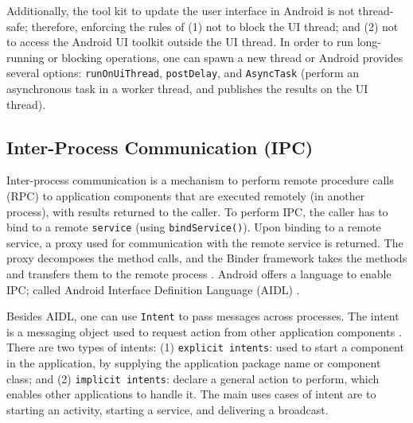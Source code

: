Additionally, the tool kit to update the user interface in Android is not thread-safe; therefore, enforcing the rules of (1) not to block the UI thread; and (2) not to access the Android UI toolkit outside the UI thread. In order to run long-running or blocking operations, one can spawn a new thread or Android provides several options: \verb|runOnUiThread|, \verb|postDelay|, and \verb|AsyncTask| (perform an asynchronous task in a worker thread, and publishes the results on the UI thread). 

\subsection{Inter-Process Communication (IPC)}
Inter-process communication is a mechanism to perform remote procedure calls (RPC) to application components that are executed remotely (in another process), with results returned to the caller. To perform IPC, the caller has to bind to a remote \verb|service| (using \verb|bindService()|). Upon binding to a remote service, a proxy used for communication with the remote service is returned. The proxy decomposes the method calls, and the Binder framework takes the methods and transfers them to the remote process \cite{binder}. Android offers a language to enable IPC; called Android Interface Definition Language (AIDL) \cite{aidl}. 

Besides AIDL, one can use \verb|Intent| to pass messages across processes. The intent is a messaging object used to request action from other application components \cite{intents}. There are two types of intents: (1) \verb|explicit intents|: used to start a component in the application, by supplying the application package name or component class; and (2) \verb|implicit intents|: declare a general action to perform, which enables other applications to handle it. The main uses cases of intent are to starting an activity, starting a service, and delivering a broadcast.  

